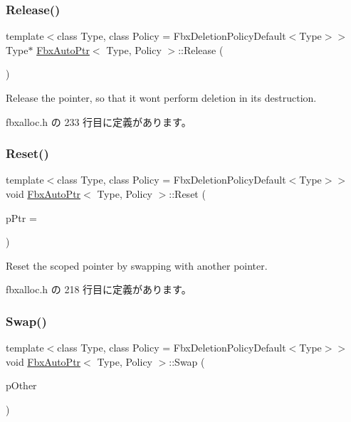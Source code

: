 \subsubsection{\texorpdfstring{Release()}{Release()}}
{\footnotesize\ttfamily template$<$class Type, class Policy = Fbx\+Deletion\+Policy\+Default$<$\+Type$>$$>$ \\
Type$\ast$ \hyperlink{class_fbx_auto_ptr}{Fbx\+Auto\+Ptr}$<$ Type, Policy $>$\+::Release (\begin{DoxyParamCaption}{ }\end{DoxyParamCaption})\hspace{0.3cm}{\ttfamily [inline]}}



Release the pointer, so that it won\textquotesingle{}t perform deletion in its destruction. 



 fbxalloc.\+h の 233 行目に定義があります。

\mbox{\label{class_fbx_auto_ptr_ab0b755d84668c33b007a3311adb2b9e1}} 
\subsubsection{\texorpdfstring{Reset()}{Reset()}}
{\footnotesize\ttfamily template$<$class Type, class Policy = Fbx\+Deletion\+Policy\+Default$<$\+Type$>$$>$ \\
void \hyperlink{class_fbx_auto_ptr}{Fbx\+Auto\+Ptr}$<$ Type, Policy $>$\+::Reset (\begin{DoxyParamCaption}\item[{Type $\ast$}]{p\+Ptr = {} }\end{DoxyParamCaption})\hspace{0.3cm}{\ttfamily [inline]}}



Reset the scoped pointer by swapping with another pointer. 



 fbxalloc.\+h の 218 行目に定義があります。

\mbox{\label{class_fbx_auto_ptr_a46656f93e4ec91ece72fb90b9091fd2c}} 
\subsubsection{\texorpdfstring{Swap()}{Swap()}}
{\footnotesize\ttfamily template$<$class Type, class Policy = Fbx\+Deletion\+Policy\+Default$<$\+Type$>$$>$ \\
void \hyperlink{class_fbx_auto_ptr}{Fbx\+Auto\+Ptr}$<$ Type, Policy $>$\+::Swap (\begin{DoxyParamCaption}\item[{\hyperlink{class_fbx_auto_ptr}{Fbx\+Auto\+Ptr}$<$ Type, Policy $>$ \&}]{p\+Other }\end{DoxyParamCaption})\hspace{0.3cm}{\ttfamily [inline]}}



